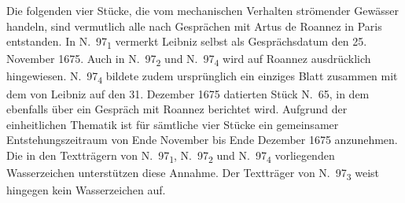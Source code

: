 \footnotesize%
\pstart%
\noindent%
Die folgenden vier St\"{u}cke,
die vom mechanischen Verhalten strömender Gewässer handeln,
sind vermut\-lich alle nach Gespr\"{a}chen mit Artus de Roannez
\protect{}%
in Paris entstanden.
In N.~97\textsubscript{1} %
vermerkt Leibniz selbst als Gespr\"{a}chsdatum den 25. November 1675.
Auch in N.~97\textsubscript{2} %
und N.~97\textsubscript{4} %
wird auf Roannez ausdrücklich hin\-ge\-wie\-sen.
N.~97\textsubscript{4} %
bildete zudem ursprünglich ein einziges Blatt zusammen mit dem von Leibniz auf den 31. Dezember 1675 datierten Stück N.~65, %
in dem ebenfalls über ein Gespräch mit Roannez
\protect{}%
berichtet wird.
Aufgrund der ein\-heit\-lichen Thematik ist für sämtliche vier Stücke ein gemeinsamer Entsteh\-ungs\-zeitraum von Ende November bis Ende Dezember 1675 anzunehmen.
Die in den Textträgern von N.~97\textsubscript{1}, %
N.~97\textsubscript{2} %
und N.~97\textsubscript{4} %
vorliegenden Wasserzeichen unterstützen diese Annahme.
Der Textträger von N.~97\textsubscript{3} %
weist hingegen kein Wasserzeichen auf.
\pend
\normalsize
